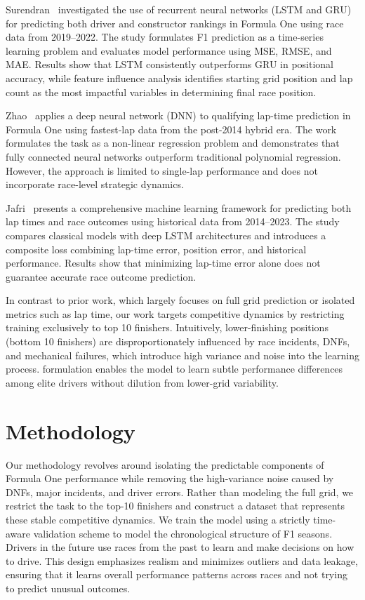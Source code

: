 \documentclass{article}
\begin{document}
Surendran~\cite{surendran2024} investigated the use of recurrent neural networks (LSTM and GRU) for predicting both driver and constructor rankings in Formula One using race data from 2019--2022. The study formulates F1 prediction as a time-series learning problem and evaluates model performance using MSE, RMSE, and MAE. Results show that LSTM consistently outperforms GRU in positional accuracy, while feature influence analysis identifies starting grid position and lap count as the most impactful variables in determining final race position.

Zhao~\cite{zhao2024} applies a deep neural network (DNN) to qualifying lap-time prediction in Formula One using fastest-lap data from the post-2014 hybrid era. The work formulates the task as a non-linear regression problem and demonstrates that fully connected neural networks outperform traditional polynomial regression. However, the approach is limited to single-lap performance and does not incorporate race-level strategic dynamics.

Jafri~\cite{jafri2024} presents a comprehensive machine learning framework for predicting both lap times and race outcomes using historical data from 2014--2023. The study compares classical models with deep LSTM architectures and introduces a composite loss combining lap-time error, position error, and historical performance. Results show that minimizing lap-time error alone does not guarantee accurate race outcome prediction.

In contrast to prior work, which largely focuses on full grid prediction or isolated metrics such as lap time, our work targets  competitive dynamics by restricting training exclusively to top 10 finishers. Intuitively, lower-finishing positions (bottom 10 finishers) are disproportionately influenced by race incidents, DNFs, and mechanical failures, which introduce high variance and noise into the learning process. formulation enables the model to learn subtle performance differences among elite drivers without dilution from lower-grid variability. 


\section{Methodology}

Our methodology revolves around isolating the predictable components of Formula One performance while removing the high-variance noise caused by DNFs, major incidents, and driver errors. Rather than modeling the full grid, we restrict the task to the top-10 finishers and construct a dataset that represents these stable competitive dynamics. We train the model using a strictly time-aware validation scheme to model the chronological structure of F1 seasons. Drivers in the future use races from the past to learn and make decisions on how to drive. This design emphasizes realism and minimizes outliers and data leakage, ensuring that it learns overall performance patterns across races and not trying to predict unusual outcomes.
\end{document}
